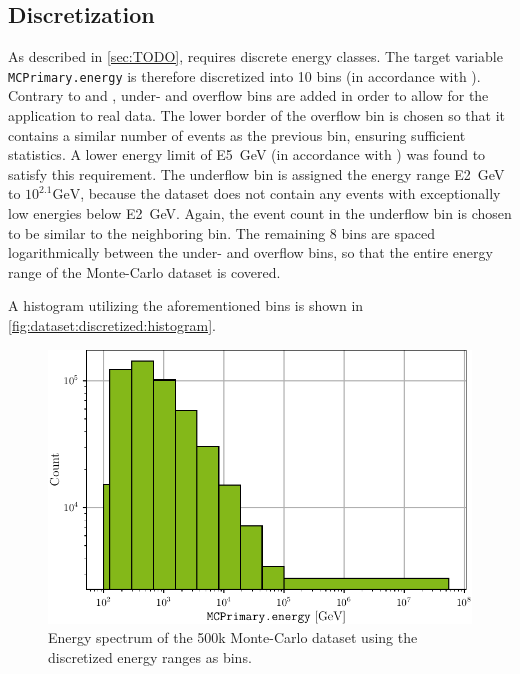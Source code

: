 \subsection{Discretization}
As described in \autoref{sec:TODO}, \dsea{} requires discrete energy classes.
The target variable \texttt{MCPrimary.energy} is therefore discretized into \num{10} bins
(in accordance with \cite{dsea_samuel}).
%
Contrary to \cite{dsea_jan} and \cite{dsea_samuel},
under- and overflow bins are added
  in order to allow for the application to real data.
%
The lower border of the overflow bin is chosen so that it contains a similar number of events as the previous bin,
ensuring sufficient statistics.
A lower energy limit of \SI{E5}{\giga\electronvolt} (in accordance with \cite{dsea_samuel}) was found to satisfy this requirement.
%
The underflow bin is assigned the energy range \SI{E2}{\giga\electronvolt} to $10^{2.1} \si{\giga\electronvolt}$,
  because the dataset does not contain any events with exceptionally low energies below \SI{E2}{\giga\electronvolt}.
Again, the event count in the underflow bin is chosen to be similar to the neighboring bin.
%
The remaining \num{8} bins are spaced logarithmically between the under- and overflow bins,
  so that the entire energy range of the Monte-Carlo dataset is covered.

A histogram utilizing the aforementioned bins is shown in \autoref{fig:dataset:discretized:histogram}.

\begin{figure}
  \centering
  \includegraphics[scale=1]{content/plots/dataset_500k:discretized:histogram_full.pdf}
  \caption{Energy spectrum of the 500k Monte-Carlo dataset using the discretized energy ranges as bins.}
  \label{fig:dataset:discretized:histogram}
\end{figure}


